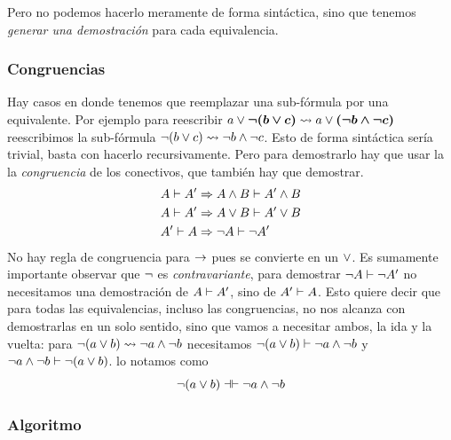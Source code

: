 Pero no podemos hacerlo meramente de forma sintáctica, sino que tenemos
\textit{generar una demostración} para cada equivalencia.

\subsubsection{Congruencias}

Hay casos en donde tenemos que reemplazar una sub-fórmula por una equivalente.  Por ejemplo para reescribir
\(
    a \vee \bm{\neg (b \vee c)}
    \rightsquigarrow
    a \vee \bm{(\neg b \wedge \neg c)}
\)
reescribimos la sub-fórmula $\neg
(b \vee
c) \rightsquigarrow \neg b \wedge \neg c$.
Esto de forma sintáctica sería trivial, basta con hacerlo recursivamente. Pero para demostrarlo hay que usar la la
\textit{congruencia} de los conectivos, que también hay que demostrar.
\begin{align*}
    A \vdash A'
        &\Rightarrow A \wedge B \vdash A' \wedge B\\
    A \vdash A'
        &\Rightarrow A \vee B \vdash A' \vee B\\
    A' \vdash A
        &\Rightarrow \neg A \vdash \neg A'
\end{align*}
No hay regla de congruencia para $\to$ pues se convierte en un $\vee$. Es
sumamente importante observar que $\neg$ es \textit{contravariante}, para
demostrar $\neg A \vdash \neg A'$ no necesitamos una demostración
de $A \vdash A'$, sino de $A' \vdash A$. Esto quiere decir que
para todas las equivalencias, incluso las congruencias, no nos alcanza con
demostrarlas en un solo sentido, sino que vamos a necesitar ambos, la
ida y la vuelta: para $\neg(a \vee b) \rightsquigarrow
\neg a \wedge \neg b$ necesitamos
\(
    \neg(a \vee b)
        \vdash \neg a \wedge \neg b
\) y \(
    \neg a \wedge \neg b \vdash \neg(a \vee b)
\). lo notamos como \[
    \neg(a \vee b)
        \dashv\vdash \neg a \wedge \neg b
\]

\subsubsection{Algoritmo}
\label{ppa:sec:dnf:algoritmo}


